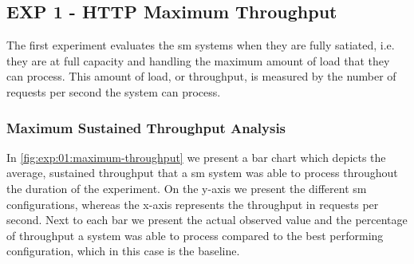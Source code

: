\subsection{\textbf{EXP 1} - HTTP Maximum Throughput}
\label{sec:experiments:results:per-experiment:01}


The first experiment evaluates the \gls{sm} systems when they are fully satiated, i.e. they are at full capacity and handling the maximum amount of load that they can process. This amount of load, or throughput, is measured by the number of requests per second the system can process.


\subsubsection{Maximum Sustained Throughput Analysis}
\label{sec:experiments:results:per-experiment:01:throughput}

In \cref{fig:exp:01:maximum-throughput} we present a bar chart which depicts the average, sustained throughput that a \gls{sm} system was able to process throughout the duration of the experiment. On the y-axis we present the different \gls{sm} configurations, whereas the x-axis represents the throughput in requests per second. Next to each bar we present the actual observed value and the percentage of throughput a system was able to process compared to the  best performing configuration, which in this case is the baseline.


